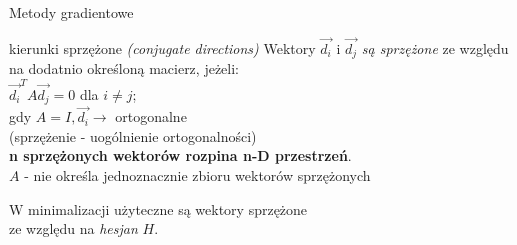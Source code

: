   \begin{frame}{Metody gradientowe}

 	\begin{block}{kierunki sprzężone \emph{(conjugate directions)}}
 	   Wektory $\vec{d_i}$ i $\vec{d_j}$ \emph{są sprzężone} ze względu na dodatnio określoną macierz, jeżeli:
 	   \\$\vec{d_i}^T A\vec{d_j} = 0$ dla $i \neq j$;
 	   \\gdy $A = I, \vec{d_i} \rightarrow$ ortogonalne
 	   \\(sprzężenie - uogólnienie ortogonalności)
 	   \\ \textbf{n sprzężonych wektorów rozpina n-D przestrzeń}.
 	   \\$A$ - nie określa jednoznacznie zbioru wektorów sprzężonych %
 	\end{block}
W minimalizacji użyteczne są wektory sprzężone
    \\ze względu na \emph{hesjan} $H$.
  \end{frame}

